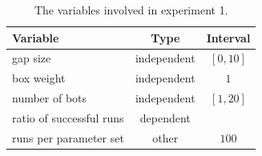 \begin{table}
 \caption{The variables involved in experiment 1.}
 \begin{center}
  \begin{tabular}{| p{5cm} | c | c |}
   \hline
   \centering \textbf{Variable} & \textbf{Type} & \textbf{Interval} \\ \hline
   gap size & independent & $[0, 10]$ \\ \hline
   box weight & independent & $1$ \\ \hline
   number of bots & independent & $[1, 20]$ \\ \hline
   ratio of successful runs & dependent &  \\ \hline
   runs per parameter set & other & $100$ \\ \hline
  \end{tabular}
 \end{center}
 \label{tbl:exp1}
\end{table}
